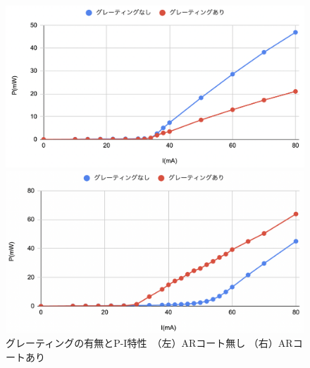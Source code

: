 \documentclass[dvipdfmx]{jsreport}
\begin{document}
\begin{figure}[hbtp]
\centering
\begin{minipage}[b]{0.45\linewidth}
\includegraphics[width=1\textwidth]{images/ld_toptica.png}
\end{minipage}
\begin{minipage}[b]{0.45\linewidth}
\includegraphics[width=1\textwidth]{images/ld_nicha.png}
\end{minipage}
\caption{\label{fig:ar}グレーティングの有無とP-I特性　（左）ARコート無し （右）ARコートあり}
\end{figure}
\end{document}
